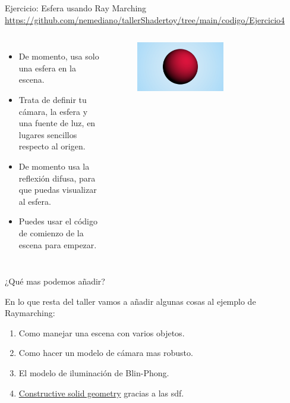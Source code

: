 \begin{frame}{Ejercicio: Esfera usando Ray Marching}
\url{https://github.com/nemediano/tallerShadertoy/tree/main/codigo/Ejercicio4}
\begin{columns}
     \begin{itemize}
         \item De momento, usa solo una esfera en la escena.
         \item Trata de definir tu cámara, la esfera y una fuente de luz, en lugares sencillos respecto al origen.
         \item De momento usa la reflexión difusa, para que puedas visualizar al esfera.
         \item Puedes usar el código de comienzo de la escena para empezar.
     \end{itemize}
        \begin{figure}[htb]
            \centering
            \includegraphics[width=0.6\textwidth]{img/Ejer/Ejer4}
        \end{figure}
\end{columns}
\end{frame}

\begin{frame}{¿Qué mas podemos añadir?}

En lo que resta del taller vamos a añadir algunas cosas al ejemplo de Raymarching:

\begin{enumerate}
    \item Como manejar una escena con varios objetos.
    \item Como hacer un modelo de cámara mas robusto.
    \item El modelo de iluminación de Blin-Phong.
    \item \href{https://en.wikipedia.org/wiki/Constructive_solid_geometry}{Constructive solid geometry} gracias a las sdf.
\end{enumerate}

\end{frame}

